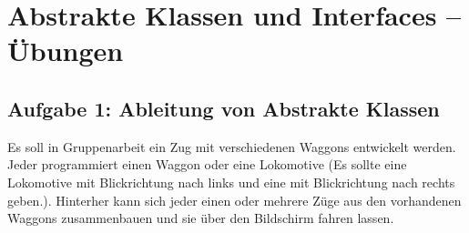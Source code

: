 \clearpage

\rehead[]{\textcolor{lightblue}{AvHG, Inf, My}}
\lohead[]{\textcolor{lightblue}{AvHG, Inf, My}}

\section{Abstrakte Klassen und Interfaces -- Übungen}

\subsection{Aufgabe 1: Ableitung von Abstrakte Klassen}

Es soll in Gruppenarbeit ein Zug mit verschiedenen Waggons entwickelt werden.
Jeder programmiert einen Waggon oder eine Lokomotive (Es sollte eine Lokomotive
mit Blickrichtung nach links und eine mit Blickrichtung nach rechts geben.).
Hinterher kann sich jeder einen oder mehrere Züge aus den vorhandenen Waggons
zusammenbauen und sie über den Bildschirm fahren lassen.

